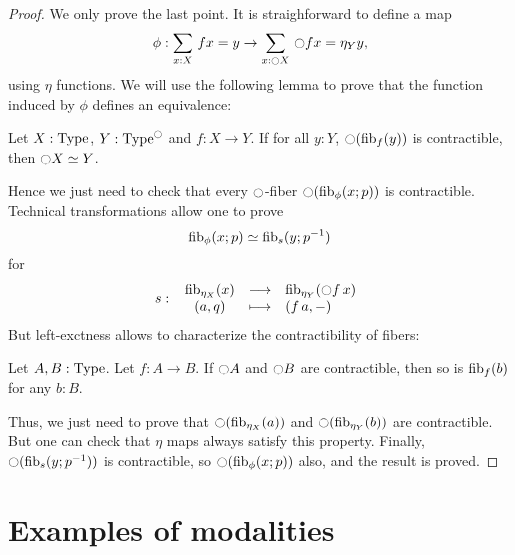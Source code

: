 \begin{proof}
  We only prove the last point.
  It is straighforward to define a map
  \[ \phi:\sum_{x:X}\, f x = y\to
    \sum_{x:\ocircle X}\, \ocircle f x = \eta_Y y,\]
  using $\eta$ functions.
  We will use the following lemma to prove that the function induced
  by $\phi$ defines an equivalence:
  \begin{lem}
    Let $X:\operatorname{Type}$, $Y:\operatorname{Type}^{\ocircle}$ and $f:X\to Y$. If for all $y:Y$,
    $\ocircle (\mathrm{fib}_{f}(y))$ is contractible, then $\ocircle X \simeq Y$.
  \end{lem}
  Hence we just need to check that every $\ocircle$-fiber $\ocircle(\mathrm{fib}_{\phi}(x;p))$ is contractible.
  Technical transformations allow one to prove
  \[ \mathrm{fib}_{\phi}(x;p) \simeq \mathrm{fib}_{s}(y;p^{-1})\]
  for
  \[
    s \, \colon \left. \begin{array}{ccl} \mathrm{fib}_{\eta_X}(x) & \longrightarrow & \mathrm{fib}_{\eta_Y}(\ocircle f\, x) \\ (a,q) & \longmapsto & (f\, a,-) \end{array} \right.
  \]
  But left-exctness allows to characterize the contractibility of fibers:
  \begin{lem}
    Let $A,B:\operatorname{Type}$. Let $f:A\to B$. If $\ocircle A$ and $\ocircle B$ are
    contractible, then so is $\mathrm{fib}_{f}(b)$ for any $b:B$.
  \end{lem}
  Thus, we just need to prove that $\ocircle(\mathrm{fib}_{\eta_X}(a))$ and
  $\ocircle(\mathrm{fib}_{\eta_Y}(b))$ are contractible. But one can check that
  $\eta$ maps always satisfy this property.
  Finally, $\ocircle(\mathrm{fib}_{s}(y;p^{-1}))$ is contractible, so $\ocircle(\mathrm{fib}_{\phi}(x;p))$ also, and the result is proved.

\end{proof}


\section{Examples of modalities}
\label{sec:modalities-examples}

